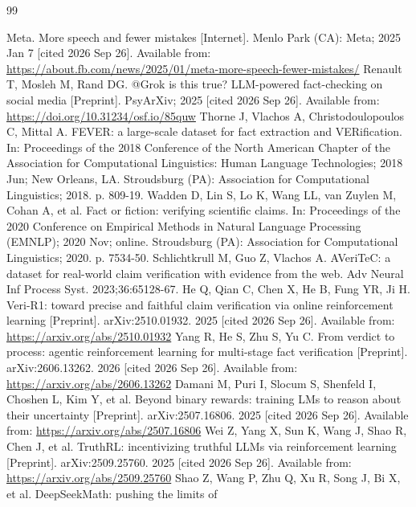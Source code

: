 \documentclass[10pt]{article}
\begin{document}
\clearpage
\begin{thebibliography}{99}\setlength{\itemsep}{1pt}\raggedright
{} Meta. More speech and fewer mistakes [Internet]. Menlo Park (CA): Meta; 2025 Jan 7
  [cited 2026 Sep 26]. Available from: \url{https://about.fb.com/news/2025/01/meta-more-speech-fewer-mistakes/}
 Renault T, Mosleh M, Rand DG. @Grok is this true? LLM-powered fact-checking on social
  media [Preprint]. PsyArXiv; 2025 [cited 2026 Sep 26]. Available from: \url{https://doi.org/10.31234/osf.io/85quw}
 Thorne J, Vlachos A, Christodoulopoulos C, Mittal A. FEVER: a large-scale dataset for fact
  extraction and VERification. In: Proceedings of the 2018 Conference of the North American Chapter of the
  Association for Computational Linguistics: Human Language Technologies; 2018 Jun; New Orleans, LA.
  Stroudsburg (PA): Association for Computational Linguistics; 2018. p. 809-19.
 Wadden D, Lin S, Lo K, Wang LL, van Zuylen M, Cohan A, et al. Fact or fiction: verifying
  scientific claims. In: Proceedings of the 2020 Conference on Empirical Methods in Natural Language
  Processing (EMNLP); 2020 Nov; online. Stroudsburg (PA): Association for Computational Linguistics; 2020.
  p. 7534-50.
 Schlichtkrull M, Guo Z, Vlachos A. AVeriTeC: a dataset for real-world claim verification
  with evidence from the web. Adv Neural Inf Process Syst. 2023;36:65128-67.
 He Q, Qian C, Chen X, He B, Fung YR, Ji H. Veri-R1: toward precise and faithful claim
  verification via online reinforcement learning [Preprint]. arXiv:2510.01932. 2025 [cited 2026 Sep 26].
  Available from: \url{https://arxiv.org/abs/2510.01932}
 Yang R, He S, Zhu S, Yu C. From verdict to process: agentic reinforcement learning for
  multi-stage fact verification [Preprint]. arXiv:2606.13262. 2026 [cited 2026 Sep 26].
  Available from: \url{https://arxiv.org/abs/2606.13262}
 Damani M, Puri I, Slocum S, Shenfeld I, Choshen L, Kim Y, et al. Beyond binary rewards:
  training LMs to reason about their uncertainty [Preprint]. arXiv:2507.16806. 2025 [cited 2026 Sep 26].
  Available from: \url{https://arxiv.org/abs/2507.16806}
 Wei Z, Yang X, Sun K, Wang J, Shao R, Chen J, et al. TruthRL: incentivizing truthful LLMs
  via reinforcement learning [Preprint]. arXiv:2509.25760. 2025 [cited 2026 Sep 26].
  Available from: \url{https://arxiv.org/abs/2509.25760}
 Shao Z, Wang P, Zhu Q, Xu R, Song J, Bi X, et al. DeepSeekMath: pushing the limits of

\end{thebibliography}
\end{document}
